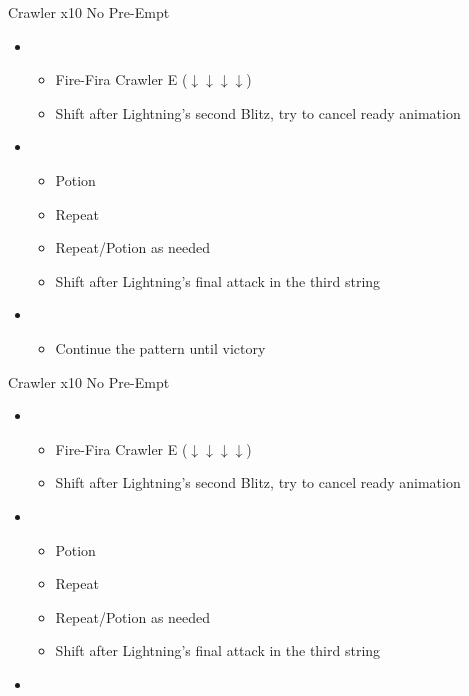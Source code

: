 \begin{paracol}{2}
	\begin{battle}{Crawler x10 No Pre-Empt}
		\begin{itemize}
			\item \first
			      \begin{itemize}
				      \item Fire-Fira Crawler E ($\downarrow \downarrow \downarrow \downarrow$)
				      \item Shift after Lightning's second Blitz, try to cancel ready animation
			      \end{itemize}
			\item \sixth
			      \begin{itemize}
				      \item Potion
				      \item Repeat
				      \item Repeat/Potion as needed
				      \item Shift after Lightning's final attack in the third string
			      \end{itemize}
			\item \first
			      \begin{itemize}
				      \item Continue the pattern until victory
			      \end{itemize}
		\end{itemize}
	\end{battle}
	\switchcolumn
	\begin{battle}{Crawler x10 No Pre-Empt}
		\begin{itemize}
			\item \first
			      \begin{itemize}
				      \item Fire-Fira Crawler E ($\downarrow \downarrow \downarrow \downarrow$)
				      \item Shift after Lightning's second Blitz, try to cancel ready animation
			      \end{itemize}
			\item \sixth
			      \begin{itemize}
				      \item Potion
				      \item Repeat
				      \item Repeat/Potion as needed
				      \item Shift after Lightning's final attack in the third string
			      \end{itemize}
			\item \first

\end{itemize}
\end{battle}
\end{paracol}
